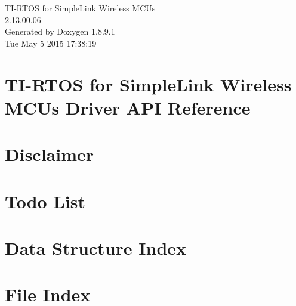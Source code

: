 \documentclass[twoside]{article}
\newcommand{\+}{\discretionary{\mbox{\scriptsize$\hookleftarrow$}}{}{}}
\begin{document}
\begin{titlepage}
\vspace*{7cm}
\begin{center}%
{\Large T\+I-\/\+R\+T\+O\+S for Simple\+Link Wireless M\+C\+Us \\[1ex]\large 2.\+13.\+00.\+06 }\\
\vspace*{1cm}
{\large Generated by Doxygen 1.8.9.1}\\
\vspace*{0.5cm}
{\small Tue May 5 2015 17:38:19}\\
\end{center}
\end{titlepage}
\tableofcontents
{}

\section{T\+I-\/\+R\+T\+O\+S for Simple\+Link Wireless M\+C\+Us Driver A\+P\+I Reference}
\label{index}\hypertarget{index}{}
\section{Disclaimer}
\label{_disclaimer}

\section{Todo List}
\label{todo}

\section{Data Structure Index}

\section{File Index}

\end{document}
